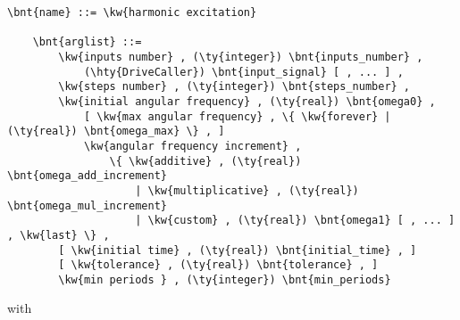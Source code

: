 \begin{Verbatim}[commandchars=\\\{\}]
    \bnt{name} ::= \kw{harmonic excitation}

    \bnt{arglist} ::=
        \kw{inputs number} , (\ty{integer}) \bnt{inputs_number} ,
            (\hty{DriveCaller}) \bnt{input_signal} [ , ... ] ,
        \kw{steps number} , (\ty{integer}) \bnt{steps_number} ,
        \kw{initial angular frequency} , (\ty{real}) \bnt{omega0} ,
            [ \kw{max angular frequency} , \{ \kw{forever} | (\ty{real}) \bnt{omega_max} \} , ]
            \kw{angular frequency increment} ,
                \{ \kw{additive} , (\ty{real}) \bnt{omega_add_increment}
                    | \kw{multiplicative} , (\ty{real}) \bnt{omega_mul_increment}
                    | \kw{custom} , (\ty{real}) \bnt{omega1} [ , ... ] , \kw{last} \} ,
        [ \kw{initial time} , (\ty{real}) \bnt{initial_time} , ]
        [ \kw{tolerance} , (\ty{real}) \bnt{tolerance} , ]
        \kw{min periods } , (\ty{integer}) \bnt{min_periods}
\end{Verbatim}
with
